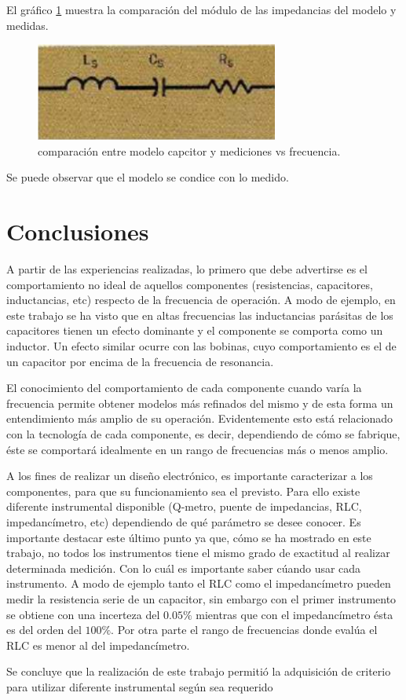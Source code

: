 \documentclass[a4paper,10pt]{article}
\begin{document}
		\indent El gráfico \ref{img:001} muestra la comparación del módulo de 
		las impedancias del modelo y medidas.

		\begin{figure}[!htb]
			\centering
			\includegraphics[width=8cm]{Imagenes/EsqCapacitor.png}
			\caption{comparación entre modelo capcitor y mediciones vs 
			frecuencia.}
			\label{img:001} 
		\end{figure}

		\indent Se puede observar que el modelo se condice con lo medido.


\newpage
\section{Conclusiones}
	\indent A partir de las experiencias realizadas, lo primero que debe advertirse es el comportamiento no ideal de aquellos componentes (resistencias, capacitores, inductancias, etc) respecto de la frecuencia de operaci\'on. A modo de ejemplo, en este trabajo se ha visto que en altas frecuencias las inductancias par\'asitas de los capacitores tienen un efecto dominante y el componente se comporta como un inductor. Un efecto similar ocurre con las bobinas, cuyo comportamiento es el de un capacitor por encima de la frecuencia de resonancia.
	
	\indent El conocimiento del comportamiento de cada componente cuando var\'ia la frecuencia permite obtener modelos m\'as refinados del mismo y de esta forma un entendimiento m\'as amplio de su operaci\'on. Evidentemente esto est\'a relacionado con la tecnolog\'ia de cada componente, es decir, dependiendo de c\'omo se fabrique, \'este se comportar\'a idealmente en un rango de frecuencias m\'as o menos amplio.
	
	\indent A los fines de realizar un dise\~no electr\'onico, es importante caracterizar a los componentes, para que su funcionamiento sea el previsto. Para ello existe diferente instrumental disponible (Q-metro, puente de impedancias, RLC, impedanc\'imetro, etc) dependiendo de qu\'e par\'ametro se desee conocer. Es importante destacar este \'ultimo punto ya que, c\'omo se ha mostrado en este trabajo, no todos los instrumentos tiene el mismo grado de exactitud al realizar determinada medici\'on. Con lo cu\'al es importante saber c\'uando usar cada instrumento. A modo de ejemplo tanto el RLC como el impedanc\'imetro pueden medir la resistencia serie de un capacitor, sin embargo con el primer instrumento se obtiene con una incerteza del $0.05 \%$ mientras que con el impedanc\'imetro \'esta es del orden del $100\%$. Por otra parte el rango de frecuencias donde eval\'ua el RLC es menor al del impedanc\'imetro.
	
	\indent Se concluye que la realizaci\'on de este trabajo permiti\'o la adquisici\'on de criterio para utilizar diferente instrumental seg\'un sea requerido\\
\end{document}

